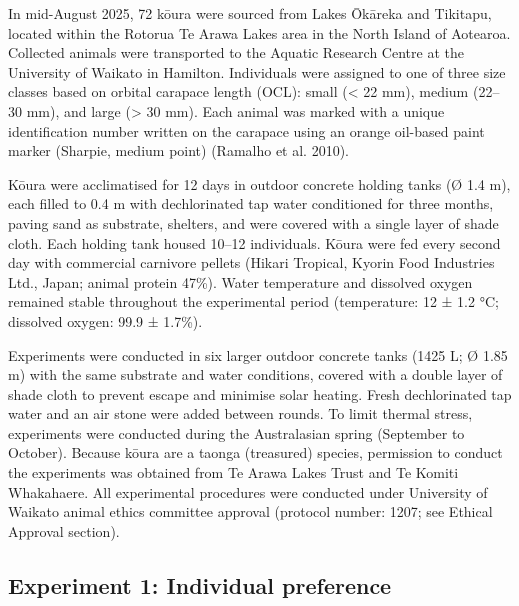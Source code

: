 \documentclass[
  12pt,
  a4paper,
  oneside]{scrbook}
\begin{document}
In mid-August 2025, 72 kōura were sourced from Lakes Ōkāreka and
Tikitapu, located within the Rotorua Te Arawa Lakes area in the North
Island of Aotearoa. Collected animals were transported to the Aquatic
Research Centre at the University of Waikato in Hamilton. Individuals
were assigned to one of three size classes based on orbital carapace
length (OCL): small (\textless{} 22 mm), medium (22--30 mm), and large
(\textgreater{} 30 mm). Each animal was marked with a unique
identification number written on the carapace using an orange oil-based
paint marker (Sharpie, medium point) (Ramalho et al. 2010).

Kōura were acclimatised for 12 days in outdoor concrete holding tanks (Ø
1.4 m), each filled to 0.4 m with dechlorinated tap water conditioned
for three months, paving sand as substrate, shelters, and were covered
with a single layer of shade cloth. Each holding tank housed 10--12
individuals. Kōura were fed every second day with commercial carnivore
pellets (Hikari Tropical, Kyorin Food Industries Ltd., Japan; animal
protein 47\%). Water temperature and dissolved oxygen remained stable
throughout the experimental period (temperature: 12 ± 1.2 °C; dissolved
oxygen: 99.9 ± 1.7\%).

Experiments were conducted in six larger outdoor concrete tanks (1425 L;
Ø 1.85 m) with the same substrate and water conditions, covered with a
double layer of shade cloth to prevent escape and minimise solar
heating. Fresh dechlorinated tap water and an air stone were added
between rounds. To limit thermal stress, experiments were conducted
during the Australasian spring (September to October). Because kōura are
a taonga (treasured) species, permission to conduct the experiments was
obtained from Te Arawa Lakes Trust and Te Komiti Whakahaere. All
experimental procedures were conducted under University of Waikato
animal ethics committee approval (protocol number: 1207; see Ethical
Approval section).

\subsection{Experiment 1: Individual
preference}\label{experiment-1-individual-preference}
\end{document}
